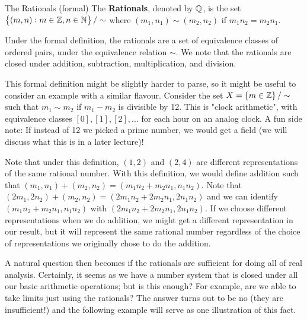 \begin{ndef}{The Rationals (formal)}
    The \textbf{Rationals}, denoted by $\mathbb{Q}$, is the set $\set{(m, n): m \in \mathbb{Z}, n \in \mathbb{N}}/\sim$ where $(m_1, n_1) \sim (m_2, n_2)$ if $m_1n_2 = m_2n_1$.
\end{ndef}
Under the formal definition, the rationals are a set of equivalence classes of ordered pairs, under the equivalence relation $\sim$. We note that the rationals are closed under addition, subtraction, multiplication, and division.

This formal definition might be slightly harder to parse, so it might be useful to consider an example with a similar flavour. Consider the set $X = \set{m \in \mathbb{Z}}/\sim$ such that $m_1 \sim m_2$ if $m_1 - m_2$ is divisible by 12. This is "clock arithmetic", with equivalence classes $[0], [1], [2], \ldots$ for each hour on an analog clock. A fun side note: If instead of 12 we picked a prime number, we would get a field (we will discuss what this is in a later lecture)!

Note that under this definition, $(1, 2)$ and $(2, 4)$ are different representations of the same rational number. With this definition, we would define addition such that $(m_1, n_1) + (m_2, n_2) = (m_1n_2 + m_2n_1, n_1n_2)$. Note that $(2m_1, 2n_2) + (m_2, n_2) = (2m_1n_2 + 2m_2n_1, 2n_1n_2)$ and we can identify $(m_1n_2 + m_2n_1, n_1n_2)$ with $(2m_1n_2 + 2m_2n_1, 2n_1n_2)$. If we choose different representations when we do addition, we might get a different representation in our result, but it will represent the same rational number regardless of the choice of representations we originally chose to do the addition. 

A natural question then becomes if the rationals are sufficient for doing all of real analysis. Certainly, it seems as we have a number system that is closed under all our basic arithmetic operations; but is this enough? For example, are we able to take limits just using the rationals? The answer turns out to be no (they are insufficient!) and the following example will serve as one illustration of this fact. 

